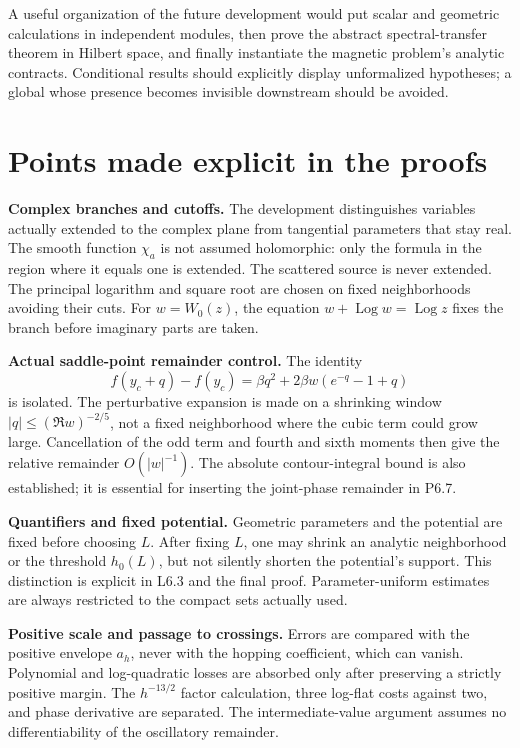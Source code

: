 \documentclass[11pt,a4paper]{article}
\newcommand{\code}[1]{\texttt{\detokenize{#1}}}
\begin{document}
A useful organization of the future development would put scalar and geometric
calculations in independent modules, then prove the abstract spectral-transfer
theorem in Hilbert space, and finally instantiate the magnetic problem's
analytic contracts. Conditional results should explicitly display
unformalized hypotheses; a global \code{axiom} whose presence becomes invisible
downstream should be avoided.

\section{Points made explicit in the proofs}
\textbf{Complex branches and cutoffs.} The development distinguishes variables
actually extended to the complex plane from tangential parameters that stay
real. The smooth function $\chi_a$ is not assumed holomorphic: only the formula
in the region where it equals one is extended. The scattered source is never
extended. The principal logarithm and square root are chosen on fixed
neighborhoods avoiding their cuts. For $w=W_0(z)$, the equation
$w+\operatorname{Log}w=\operatorname{Log}z$ fixes the branch before imaginary
parts are taken.

\textbf{Actual saddle-point remainder control.} The identity
\[
 f(y_c+q)-f(y_c)=\beta q^2+2\beta w(e^{-q}-1+q)
\]
is isolated. The perturbative expansion is made on a shrinking window
$|q|\le(\Re w)^{-2/5}$, not a fixed neighborhood where the cubic term could grow
large. Cancellation of the odd term and fourth and sixth moments then give
the relative remainder $O(|w|^{-1})$. The absolute contour-integral bound is
also established; it is essential for inserting the joint-phase remainder in
P6.7.

\textbf{Quantifiers and fixed potential.} Geometric parameters and the
potential are fixed before choosing $L$. After fixing $L$, one may shrink an
analytic neighborhood or the threshold $h_0(L)$, but not silently shorten the
potential's support. This distinction is explicit in L6.3 and the final proof.
Parameter-uniform estimates are always restricted to the compact sets actually
used.

\textbf{Positive scale and passage to crossings.} Errors are compared with the
positive envelope $a_h$, never with the hopping coefficient, which can vanish.
Polynomial and log-quadratic losses are absorbed only after preserving a
strictly positive margin. The $h^{-13/2}$ factor calculation, three log-flat
costs against two, and phase derivative are separated. The intermediate-value
argument assumes no differentiability of the oscillatory remainder.
\end{document}

